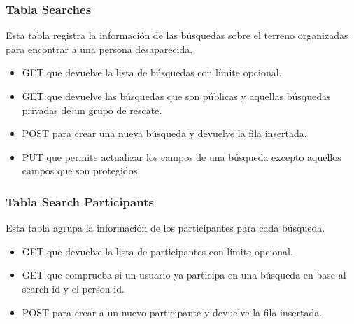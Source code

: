     \subsubsection{Tabla Searches}
        Esta tabla registra la información de las búsquedas sobre el terreno organizadas para encontrar a una persona desaparecida.
        \begin{itemize}
            \item GET que devuelve la lista de búsquedas con límite opcional.
            \item GET que devuelve las búsquedas que son públicas y aquellas búsquedas privadas de un grupo de rescate.
            \item POST para crear una nueva búsqueda y devuelve la fila insertada.
            \item PUT que permite actualizar los campos de una búsqueda excepto aquellos campos que son protegidos.
        \end{itemize}
  
    \subsubsection{Tabla Search Participants}
        Esta tabla agrupa la información de los participantes para cada búsqueda.
        \begin{itemize}
            \item GET que devuelve la lista de participantes con límite opcional.
            \item GET que comprueba si un usuario ya participa en una búsqueda en base al search id y el person id.
            \item POST para crear a un nuevo participante y devuelve la fila insertada.
        \end{itemize}

